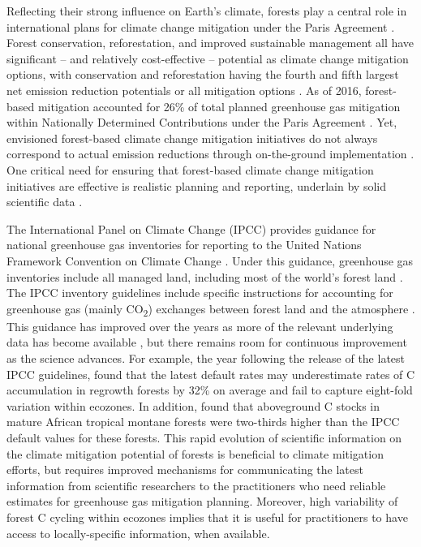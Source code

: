 \documentclass[, manuscript]{copernicus}
\begin{document}
Reflecting their strong influence on Earth's climate, forests play a
central role in international plans for climate change mitigation under
the Paris Agreement \citep{unfccc_adoption_2015}. Forest conservation,
reforestation, and improved sustainable management all have significant
-- and relatively cost-effective -- potential as climate change
mitigation options, with conservation and reforestation having the
fourth and fifth largest net emission reduction potentials or all
mitigation options \citep{ipcc_summary_2022}. As of 2016, forest-based
mitigation accounted for 26\% of total planned greenhouse gas mitigation
within Nationally Determined Contributions under the Paris Agreement
\citep{grassi_key_2017}. Yet, envisioned forest-based climate change
mitigation initiatives do not always correspond to actual emission
reductions through on-the-ground implementation
\citep[e.g.,][]{badgley_systematic_2022}. One critical need for ensuring
that forest-based climate change mitigation initiatives are effective is
realistic planning and reporting, underlain by solid scientific data
\citep{anderson-teixeira_effective_2022, deng_comparing_2021}.

The International Panel on Climate Change (IPCC) provides guidance for
national greenhouse gas inventories for reporting to the United Nations
Framework Convention on Climate Change
\citep[UNFCCC,][]{ipcc_2006_2006, ipcc_2019_2019}. Under this guidance,
greenhouse gas inventories include all managed land, including most of
the world's forest land \citep{ogle_delineating_2018}. The IPCC
inventory guidelines include specific instructions for accounting for
greenhouse gas (mainly CO\textsubscript{2}) exchanges between forest
land and the atmosphere \citep{ipcc_agriculture_2006, ipcc_2019_2019}.
This guidance has improved over the years as more of the relevant
underlying data has become available
\citep{requenasuarez_estimating_2019, rozendaal_aboveground_2022}, but
there remains room for continuous improvement as the science advances.
For example, the year following the release of the latest IPCC
guidelines, \citet{cook-patton_mapping_2020} found that the latest
default rates may underestimate rates of C accumulation in regrowth
forests by 32\% on average and fail to capture eight-fold variation
within ecozones. In addition, \citet{cuni-sanchez_high_2021} found that
aboveground C stocks in mature African tropical montane forests were
two-thirds higher than the IPCC default values for these forests. This
rapid evolution of scientific information on the climate mitigation
potential of forests is beneficial to climate mitigation efforts, but
requires improved mechanisms for communicating the latest information
from scientific researchers to the practitioners who need reliable
estimates for greenhouse gas mitigation planning. Moreover, high
variability of forest C cycling within ecozones
\citep[e.g.,][]{cook-patton_mapping_2020, cuni-sanchez_high_2021}
implies that it is useful for practitioners to have access to
locally-specific information, when available.
\end{document}
